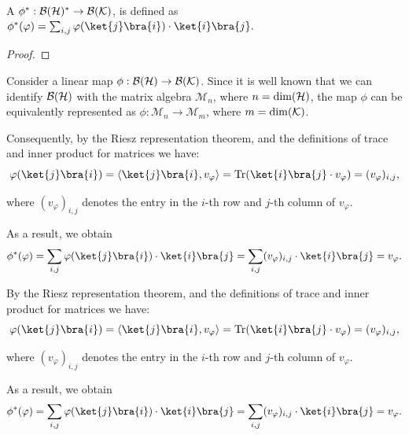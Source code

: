 \begin{proposition}
  A $\phi^*: \mathcal{B}(\mathcal{H})^* \to \mathcal{B}(\mathcal{K})$,  is defined as $\phi^*(\varphi) = \sum_{i,j} \varphi(\ket{j}\bra{i}) \cdot \ket{i}\bra{j}.$
\end{proposition}



\begin{proof}
  
\end{proof}



 Consider a linear map $\phi: \mathcal{B}(\mathcal{H}) \to \mathcal{B}(\mathcal{K})$. Since it is well known that we can identify $\mathcal{B}(\mathcal{H})$ with the matrix algebra $\mathcal{M}_{n}$, where $n = \dim(\mathcal{H})$, the map $\phi$ can be equivalently represented as $\phi:\mathcal{M}_{n} \to \mathcal{M}_{m}$, where $m = \dim(\mathcal{K})$.
 
 Consequently, by the Riesz representation theorem, and the definitions of trace and  inner product for matrices we have:
\[ \varphi(\ket{j} \bra{i})= \langle \ket{j} \bra{i},  v_\varphi  \rangle =  \tr(\ket{i}\bra{j} \cdot v_{\varphi}) =  (v_{\varphi})_{i, j}, \]

where $(v_{\varphi})_{i, j}$ denotes the entry in the $i$-th row and $j$-th column of $v_{\varphi}$. 

As a result, we obtain
\[
\phi^*(\varphi) = \sum_{i,j} \varphi(\ket{j}\bra{i}) \cdot \ket{i}\bra{j}
= \sum_{i,j} (v_{\varphi})_{i,j} \cdot \ket{i}\bra{j}
= v_\varphi.
\]


By the Riesz representation theorem, and the definitions of trace and  inner product for matrices we have:
\[ \varphi(\ket{j} \bra{i})= \langle \ket{j} \bra{i},  v_\varphi  \rangle =  \tr(\ket{i}\bra{j} \cdot v_{\varphi}) =  (v_{\varphi})_{i, j}, \]

where $(v_{\varphi})_{i, j}$ denotes the entry in the $i$-th row and $j$-th column of $v_{\varphi}$. 

As a result, we obtain
\[
\phi^*(\varphi) = \sum_{i,j} \varphi(\ket{j}\bra{i}) \cdot \ket{i}\bra{j}
= \sum_{i,j} (v_{\varphi})_{i,j} \cdot \ket{i}\bra{j}
= v_\varphi.
\]




